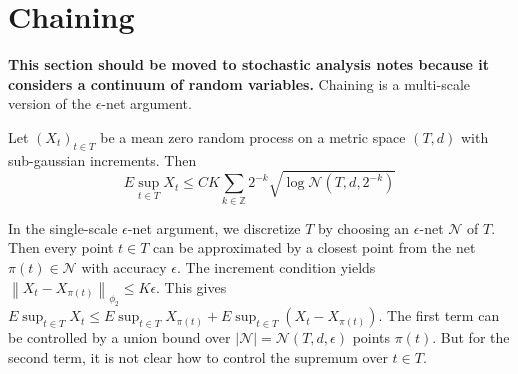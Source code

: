 \section{Chaining}
\textbf{This section should be moved to stochastic analysis notes because it considers a continuum of random variables.}
Chaining is a multi-scale version of the $\epsilon$-net argument.
\begin{lemma}
    Let $(X_t)_{t\in T}$ be a mean zero random process on a metric space $(T,d)$ with sub-gaussian increments.
    Then \[E\sup_{t\in T}X_t\le CK\sum_{k\in\mathbb{Z}}2^{-k}\sqrt{\log \mathcal{N}(T,d,2^{-k})}\]
\end{lemma}
In the single-scale $\epsilon$-net argument, we discretize $T$ by choosing an $\epsilon$-net $\mathcal{N}$ of $T$.
Then every point $t\in T$ can be approximated by a closest point from the net $\pi(t)\in\mathcal{N}$ with accuracy $\epsilon$.
The increment condition yields $\left\|X_t-X_{\pi(t)}\right\|_{\phi_2}\le K\epsilon$. This gives $E\sup_{t\in T}X_t\le E\sup_{t\in T}X_{\pi(t)}+E\sup_{t\in T}(X_t-X_{\pi(t)})$.
The first term can be controlled by a union bound over $\left|\mathcal{N}\right|=\mathcal{N}(T,d,\epsilon)$ points $\pi(t)$.
But for the second term, it is not clear how to control the supremum over $t\in T$.


